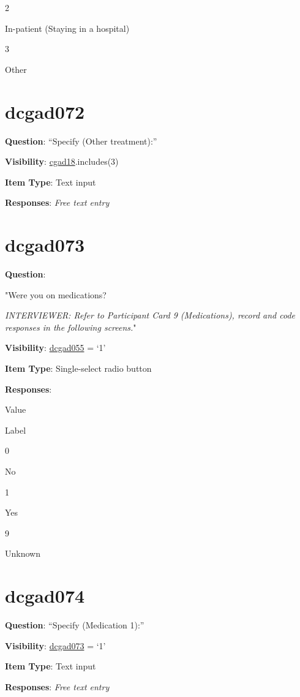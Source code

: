 \documentclass[]{book}
\begin{document}
2

In-patient (Staying in a hospital)

3

Other

\hypertarget{dcgad072}{%
\section{dcgad072}\label{dcgad072}}

\textbf{Question}: ``Specify (Other treatment):''

\textbf{Visibility}: \protect\hyperlink{cgad18}{cgad18}.includes(3)

\textbf{Item Type}: Text input

\textbf{Responses}: \emph{Free text entry}

\hypertarget{dcgad073}{%
\section{dcgad073}\label{dcgad073}}

\textbf{Question}:

"Were you on medications?

\emph{INTERVIEWER: Refer to Participant Card 9 (Medications), record and code responses in the following screens.}"

\textbf{Visibility}: \protect\hyperlink{dcgad055}{dcgad055} = `1'

\textbf{Item Type}: Single-select radio button

\textbf{Responses}:

Value

Label

0

No

1

Yes

9

Unknown

\hypertarget{dcgad074}{%
\section{dcgad074}\label{dcgad074}}

\textbf{Question}: ``Specify (Medication 1):''

\textbf{Visibility}: \protect\hyperlink{dcgad073}{dcgad073} = `1'

\textbf{Item Type}: Text input

\textbf{Responses}: \emph{Free text entry}
\end{document}

